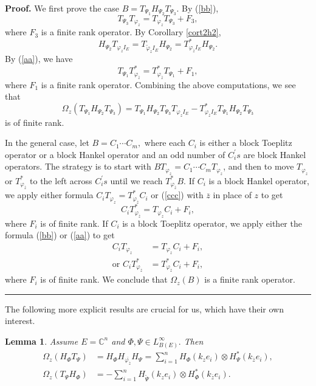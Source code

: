 \documentclass{article}%
\newtheorem{lemma}[theorem]{Lemma}
\newenvironment{proof}[1][Proof]{\noindent\textbf{#1.} }{\ \rule{0.5em}{0.5em}}
\begin{document}
\begin{proof}
We first prove the case $B=T_{\Psi_{1}}H_{\Psi_{2}}T_{\Psi_{3}}.$ By
(\ref{bb}),
\[
T_{\Psi_{3}}T_{\varphi_{z}}=T_{\varphi_{z}}T_{\Psi_{3}}+F_{3},
\]
where $F_{3}$ is a finite rank operator. By Corollary \ref{cort2h2},
\[
H_{\Psi_{2}}T_{\varphi_{z}I_{E}}=T_{\widetilde{\varphi}_{z}I_{E}}H_{\Psi_{2}%
}=T_{\varphi_{\overline{z}}I_{E}}^{\ast}H_{\Psi_{2}}.
\]
By (\ref{aa}), we have%
\[
T_{\Psi_{1}}T_{\varphi_{\overline{z}}}^{\ast}=T_{\varphi_{\overline{z}}}%
^{\ast}T_{\Psi_{1}}+F_{1},
\]
where $F_{1}$ is a finite rank operator. Combining the above computations, we
see that
\[
\Omega_{z}(T_{\Psi_{1}}H_{\Psi_{2}}T_{\Psi_{3}})=T_{\Psi_{1}}H_{\Psi_{2}%
}T_{\Psi_{3}}T_{\varphi_{z}I_{E}}-T_{\varphi_{\overline{z}}I_{E}}^{\ast
}T_{\Psi_{1}}H_{\Psi_{2}}T_{\Psi_{3}}%
\]
is of finite rank.

In the general case, let $B=C_{1}\cdots C_{m},$ where each $C_{i}$ is either a
block Toeplitz operator or a block Hankel operator and an odd number of
$C_{i}^{\prime}s$ are block Hankel operators. The strategy is to start with
$BT_{\varphi_{z}}=C_{1}\cdots C_{m}T_{\varphi_{z}}$, and then to move
$T_{\varphi_{z}}$ or $T_{\varphi_{\overline{z}}}^{\ast}$ to the left across
$C_{i}^{\prime}s$ until we reach $T_{\varphi_{\overline{z}}}^{\ast}B.$ If
$C_{i}$ is a block Hankel operator, we apply either formula $C_{i}%
T_{\varphi_{z}}=T_{\varphi_{\overline{z}}}^{\ast}C_{i}$ or (\ref{ccc}) with
$\overline{z}$ in place of $z$ to get
\[
C_{i}T_{\varphi_{\overline{z}}}^{\ast}=T_{\varphi_{z}}C_{i}+F_{i},
\]
where $F_{i}$ is of finite rank. If $C_{i}$ is a block Toeplitz operator, we
apply either the formula (\ref{bb}) or (\ref{aa}) to get
\begin{align*}
C_{i}T_{\varphi_{z}}  &  =T_{\varphi_{z}}C_{i}+F_{i},\\
\text{or }C_{i}T_{\varphi_{\overline{z}}}^{\ast}  &  =T_{\varphi_{\overline
{z}}}^{\ast}C_{i}+F_{i},
\end{align*}
where $F_{i}$ is of finite rank. We conclude that $\Omega_{z}(B)$ is a finite
rank operator.
\end{proof}

The following more explicit results are crucial for us, which have their own interest.

\begin{lemma}
\label{key}Assume $E=\mathbb{C}^{n}$ and $\Phi,\Psi\in L_{B(E)}^{\infty}.$
Then
\begin{align*}
\Omega_{z}(H_{\Phi}T_{\Psi})  &  =H_{\Phi}H_{\overline{\varphi_{\overline{z}}%
}}H_{\Psi}=\sum_{i=1}^{n}H_{\Phi}\left(  k_{z}e_{i}\right)  \otimes H_{\Psi
}^{\ast}\left(  k_{\overline{z}}e_{i}\right)  ,\\
\Omega_{z}(T_{\Psi}H_{\Phi})  &  =-\sum_{i=1}^{n}H_{\widetilde{\Psi}}\left(
k_{z}e_{i}\right)  \otimes H_{\Phi}^{\ast}\left(  k_{\overline{z}}%
e_{i}\right)  .
\end{align*}

\end{lemma}
\end{document}
